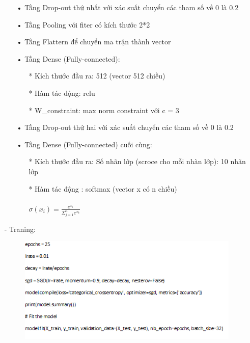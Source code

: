 \documentclass[a4paper,12pt]{report}
\begin{document}
\begin{itemize}
\begin{itemize}
\item[•] Tầng Drop-out thứ nhất với xác suất chuyển các tham số về 0 là 0.2
\item[•] Tầng Pooling với fiter có kích thước 2*2
\item[•] Tầng Flattern để chuyển ma trận thành vector 
\item[•] Tầng Dense (Fully-connected):
\begin{itemize}
\item[*] Kích thước đầu ra: 512 (vector 512 chiều)
\item[*] Hàm tác động: relu
\item[*] W\_constraint:  max norm constraint với c = 3
\end{itemize}
\item[•] Tầng Drop-out thứ hai với xác suất chuyển các tham số về 0 là 0.2
\item[•] Tầng Dense (Fully-connected) cuối cùng:
\begin{itemize}
\item[*] Kích thước đầu ra: Số nhãn lớp (scroce cho mỗi nhàn lớp): 10 nhãn lớp
\item[*] Hàm tác động : softmax (vector x có n chiều) \\ \\ 
\hspace*{2cm} $\sigma(x_i) = \frac{e^{x_i}}{\Sigma_{j=1}^{n}e^{x_k}}$
\end{itemize}
\end{itemize}
\item[-] Traning:

\begin{figure}[h]
\begin{center}
\includegraphics[width =0.7 \textwidth]{code3.png}
\end{center}
\end{figure}


\end{itemize}
\end{document}
